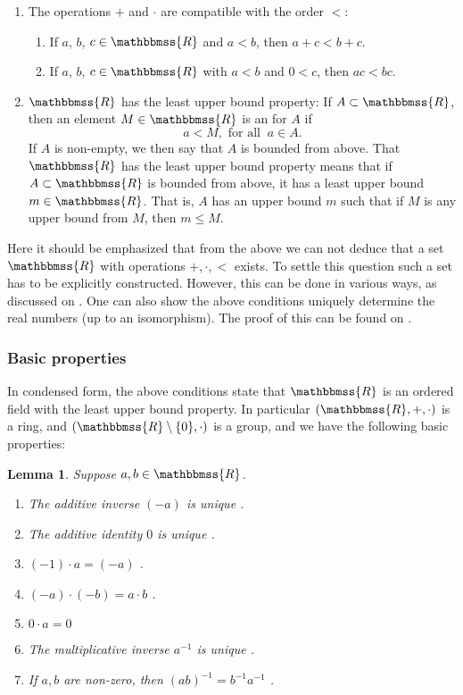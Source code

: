 \documentclass[12pt]{article}
\newcommand{\R}{\mathbbmss{R}}
\newtheorem{lemma}{Lemma}
\begin{document}
\begin{enumerate}
\item The operations $+$ and $\cdot$ are compatible with the order $<$:
\begin{enumerate}
\item If $a$, $b$, $c\in\R$ and $a<b$, then $a+c<b+c$. 
\item If $a$, $b$, $c\in\R$ with $a<b$ and $0<c$, then $ac<bc$.
\end{enumerate}

\item $\R$ has the least upper bound property: If $A\subset \R$,
then an element $M\in \R$ is an  for $A$ if
\[
  a<M, \mbox{ for all }\ a\in A.
\]
If $A$ is non-empty, we then say that $A$ is bounded from above. 
That $\R$ has the least upper bound property means that
if $A\subset \R$ is bounded from above, it has a least upper bound $m\in \R$. That is, 
$A$ has an upper bound $m$ such that if $M$ is any upper bound from $M$, 
then $m\le M$. 
\end{enumerate}

Here it should be emphasized that from the above we can not deduce that 
a set $\R$ with operations $+,\cdot,<$ exists. To settle this question such 
a set has to be explicitly constructed. However, this can be done in various ways, as
discussed on .
One can also show the above conditions uniquely determine the real numbers 
(up to an isomorphism). The proof of this can be found on 
.


\subsubsection*{Basic properties}
In condensed form, the above conditions state that $\R$ is an ordered 
field with the least upper bound property. In particular $(\R,+,\cdot)$ 
is a ring, and $(\R\setminus\{0\},\cdot)$ is a group, and we have the following basic properties:

\begin{lemma}Suppose $a,b\in \R$. 
\begin{enumerate} 
\item The additive inverse $(-a)$ is unique .
\item The additive identity $0$ is unique .
\label{minusProperty}
\item $(-1)\cdot a=(-a)$ .
\item $(-a)\cdot(-b)=a\cdot b$ .
\item $0\cdot a=0$ 
\item The multiplicative inverse $a^{-1}$ is unique .
\item If $a,b$ are non-zero, then $(ab)^{-1}=b^{-1} a^{-1}$ .
\end{enumerate}
\end{lemma}
\end{document}
